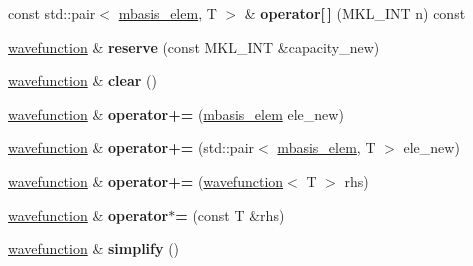 \begin{DoxyCompactItemize}
const std\+::pair$<$ \hyperlink{classqbasis_1_1mbasis__elem}{mbasis\+\_\+elem}, T $>$ \& {\bfseries operator\mbox{[}$\,$\mbox{]}} (M\+K\+L\+\_\+\+I\+NT n) const
\item 
\mbox{\label{classqbasis_1_1wavefunction_a7441a7a2f5f63ad7f762a3cfef45bd6c}} 
\hyperlink{classqbasis_1_1wavefunction}{wavefunction} \& {\bfseries reserve} (const M\+K\+L\+\_\+\+I\+NT \&capacity\+\_\+new)
\item 
\mbox{\label{classqbasis_1_1wavefunction_a0ee4f9839c45f321dc4fc5d1ea688a21}} 
\hyperlink{classqbasis_1_1wavefunction}{wavefunction} \& {\bfseries clear} ()
\item 
\mbox{\label{classqbasis_1_1wavefunction_ac5943f9fd1b943e35a5e86a8baae45e4}} 
\hyperlink{classqbasis_1_1wavefunction}{wavefunction} \& {\bfseries operator+=} (\hyperlink{classqbasis_1_1mbasis__elem}{mbasis\+\_\+elem} ele\+\_\+new)
\item 
\mbox{\label{classqbasis_1_1wavefunction_a7bf946d8ba99a9c3351a20060fb4cd73}} 
\hyperlink{classqbasis_1_1wavefunction}{wavefunction} \& {\bfseries operator+=} (std\+::pair$<$ \hyperlink{classqbasis_1_1mbasis__elem}{mbasis\+\_\+elem}, T $>$ ele\+\_\+new)
\item 
\mbox{\label{classqbasis_1_1wavefunction_a1aad70a2b9a2382ef4999595b38936b6}} 
\hyperlink{classqbasis_1_1wavefunction}{wavefunction} \& {\bfseries operator+=} (\hyperlink{classqbasis_1_1wavefunction}{wavefunction}$<$ T $>$ rhs)
\item 
\mbox{\label{classqbasis_1_1wavefunction_a8e4d1db7b5879ad9279d9b19bbac1c0d}} 
\hyperlink{classqbasis_1_1wavefunction}{wavefunction} \& {\bfseries operator$\ast$=} (const T \&rhs)
\item 
\mbox{\label{classqbasis_1_1wavefunction_a126dd4b3f9362bc0dba6b852ca91b2bd}} 
\hyperlink{classqbasis_1_1wavefunction}{wavefunction} \& {\bfseries simplify} ()
\end{DoxyCompactItemize}
